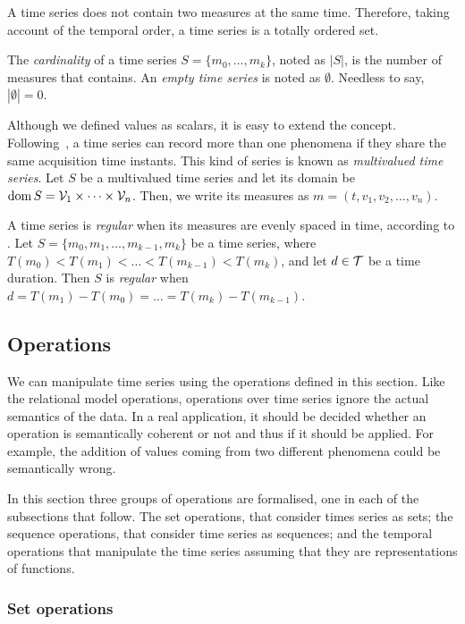 A time series does not contain two measures at the same time. Therefore,
taking account of the temporal order, a time series is a totally
ordered set.

The \emph{cardinality} of a time series $S=\{m_0,\dots,m_k\}$, noted
as $|S|$, is the number of measures that contains.  An \emph{empty
  time series} is noted as $\emptyset$. Needless to say,
$|\emptyset|=0$.

Although we defined values as scalars, it is easy to extend the
concept. Following~\cite{assfalg08:thesis}, a time series can record
more than one phenomena if they share the same acquisition time
instants.  This kind of series is known as \emph{multivalued time
  series}. Let $S$ be a multivalued time series and let its domain be
$\operatorname{dom} S={\cal{V}}_1\times\cdots\times{\cal{V}}_n$. Then, we write its
measures as $m=(t,v_1,v_2,\ldots,v_n)$.

A time series is \emph{regular} when its measures are evenly spaced in
time, according to \cite{last:hetland}.  Let $S=\{m_0, m_1,\ldots,
m_{k-1},m_k\}$ be a time series, where
$T(m_0)<T(m_1)<\dots<T(m_{k-1})<T(m_k)$, and let $d\in\cal{T}$ be a
time duration. Then $S$ is \emph{regular} when $d=T(m_1)-T(m_0)=\dots
=T(m_k)-T(m_{k-1})$.

\subsection{Operations}
\label{sec:model:operations}

We can manipulate time series using the operations defined in this
section. Like the relational model operations, operations over time
series ignore the actual semantics of the data. In a real application,
it should be decided whether an operation is semantically coherent or
not and thus if it should be applied. For example, the addition of
values coming from two different phenomena could be semantically
wrong.

In this section three groups of operations are formalised, one in each
of the subsections that follow. The set operations, that consider
times series as sets; the sequence operations, that consider time
series as sequences; and the temporal operations that manipulate the
time series assuming that they are representations of functions.


\subsubsection{Set operations}
\label{sec:set}

